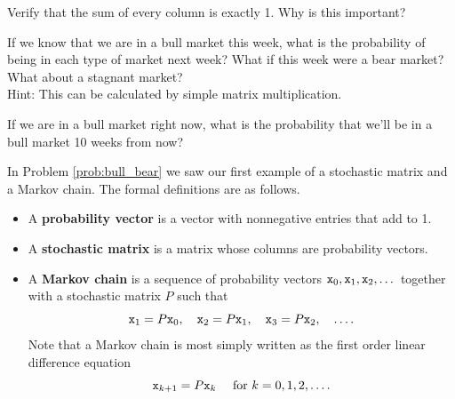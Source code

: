 \begin{problem}
        \item Verify that the sum of every column is exactly 1.  Why is this important?
        \item If we know that we are in a bull market this week, what is the probability
            of being in each type of market next week? What if this week were a bear
            market?  What about a stagnant market? \\ Hint: This can be calculated by
            simple matrix multiplication.
        \item If we are in a bull market right now, what is the probability that we'll be
            in a bull market 10 weeks from now?
    \ea

\end{problem}
% 


In Problem \ref{prob:bull_bear} we saw our first example of a stochastic matrix and a
Markov chain.  The formal definitions are as follows.
\begin{definition}\label{def:10.7.markov}
    \begin{itemize}
        \item A {\bf probability vector} is a vector with nonnegative entries that add to
            1.
        \item A {\bf stochastic matrix} is a matrix whose columns are probability vectors.
        \item A {\bf Markov chain} is a sequence of probability vectors $\texttt{x}_0, \texttt{x}_1,
            \texttt{x}_2, \dots$ together with a stochastic matrix $P$ such that
            \[ \texttt{x}_1 = P\texttt{x}_0, \quad \texttt{x}_2 = P\texttt{x}_1, \quad \texttt{x}_3 = P \texttt{x}_2, \quad \ldots.
                \]
            Note that a Markov chain is most simply written as the first order linear
            difference equation 
            \[ \texttt{x}_{k+1} = P \texttt{x}_k \quad \text{ for } k=0, 1, 2, \dots. \]
    \end{itemize}
\end{definition}

